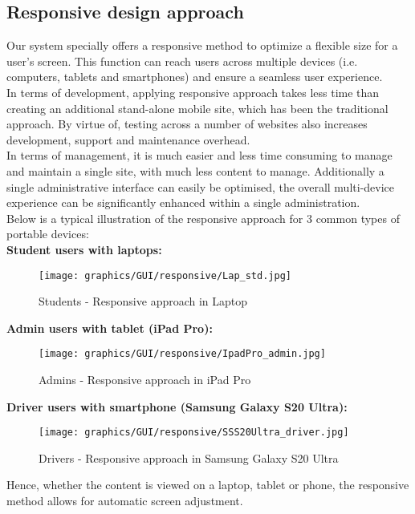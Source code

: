 \subsection{Responsive design approach}
\noindent Our system specially offers a responsive method to optimize a flexible size for a user's screen. This function can reach users across multiple devices (i.e. computers, tablets and smartphones) and ensure a seamless user experience.\\
\noindent In terms of development, applying responsive approach takes less time than creating an additional stand-alone mobile site, which has been the traditional approach. By virtue of, testing across a number of websites also increases development, support and maintenance overhead.\\
\noindent In terms of management, it is much easier and less time consuming to manage and maintain a single site,  with much less content to manage. Additionally a single administrative interface can easily be optimised, the overall multi-device experience can be significantly enhanced within a single administration.\\
\noindent Below is a typical illustration of the responsive approach for 3 common types of portable devices:\\
\newpage
    \textbf{Student users with laptops:}
        \begin{figure}[H]
            \centering
            \texttt{[image: graphics/GUI/responsive/Lap\_std.jpg]}
            \caption{Students - Responsive approach in Laptop}
            \label{fig:driver_noti}
        \end{figure}
\newpage        
    \textbf{Admin users with tablet (iPad Pro):}
        \begin{figure}[H]
            \centering
            \texttt{[image: graphics/GUI/responsive/IpadPro\_admin.jpg]}
            \caption{Admins - Responsive approach in iPad Pro}
            \label{fig:admin_ipadpro}
        \end{figure}
\newpage        
    \textbf{Driver users with smartphone (Samsung Galaxy S20 Ultra):}
        \begin{figure}[H]
            \centering
            \texttt{[image: graphics/GUI/responsive/SSS20Ultra\_driver.jpg]}
            \caption{Drivers - Responsive approach in Samsung Galaxy S20 Ultra}
            \label{fig:driver_sss20ultra}
        \end{figure}
        
\noindent Hence, whether the content is viewed on a laptop, tablet or phone, the responsive method allows for automatic screen adjustment.
    \newpage